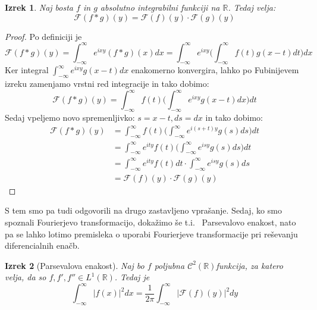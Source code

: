 \documentclass[a4paper, 10pt]{article}
\newtheorem{izr}{Izrek}
\newcommand{\abs}[1]{\ensuremath{\lvert #1 \rvert}}
\newcommand{\mth}[1]{\ensuremath{\mathbb{#1}}}
\newcommand{\R}{\mth{R}}
\begin{document}
			\begin{izr}
				\label{izr:konvFT}
				Naj bosta $f$ in $g$ absolutno integrabilni funkciji na $\R$. Tedaj velja: $$\mathcal{F}(f*g)(y) = \mathcal{F}(f)(y)\cdot\mathcal{F}(g)(y)$$
			\end{izr}
			\begin{proof}
				Po definiciji je $$\mathcal{F}(f*g)(y) = \int_{-\infty}^{\infty}e^{ixy}(f*g)(x)dx = \int_{-\infty}^{\infty}e^{ixy}\big(\int_{-\infty}^{\infty}f(t)g(x-t)dt\big)dx$$
				Ker integral $\int_{-\infty}^{\infty}e^{ixy}g(x-t)dx$ enakomerno konvergira, lahko po Fubinijevem izreku zamenjamo vrstni red integracije in tako dobimo: $$
				\mathcal{F}(f*g)(y) = \int_{-\infty}^{\infty}f(t)\big(\int_{-\infty}^{\infty}e^{ixy}g(x-t)dx\big)dt
				$$
				Sedaj vpeljemo novo spremenljivko: $s = x-t, ds = dx$ in tako dobimo: \begin{align*}
					\mathcal{F}(f*g)(y) &= \int_{-\infty}^{\infty}f(t)\big(\int_{-\infty}^{\infty}e^{i(s+t)y}g(s)ds\big)dt \\
					&= \int_{-\infty}^{\infty}e^{ity}f(t)\big(\int_{-\infty}^{\infty}e^{isy}g(s)ds\big)dt \\
					&= \int_{-\infty}^{\infty}e^{ity}f(t)dt \cdot\int_{-\infty}^{\infty}e^{isy}g(s)ds \\
					&= \mathcal{F}(f)(y)\cdot\mathcal{F}(g)(y)
				\end{align*}
				
			\end{proof}
			
			S tem smo pa tudi odgovorili na drugo zastavljeno vprašanje. Sedaj, ko smo spoznali Fourierjevo transformacijo, dokažimo še t.i.~ Parsevalovo enakost, nato pa se lahko lotimo premisleka o uporabi Fourierjeve transformacije pri reševanju diferencialnih enačb.
			
			\begin{izr}[Parsevalova enakost]
				\label{izr:Parseval}
				Naj bo $f$ poljubna $\mathcal{C}^2(\R)$funkcija, za katero velja, da so $f, f', f''\in L^1(\R)$. Tedaj je $$\int_{-\infty}^{\infty}\abs{f(x)}^2dx = \frac{1}{2\pi}\int_{-\infty}^{\infty}\abs{\mathcal{F}(f)(y)}^2dy$$
			\end{izr}
			
\end{document}
